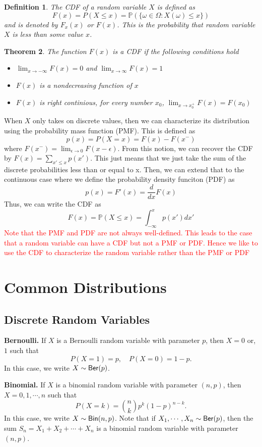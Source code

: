 \documentclass[twoside]{article}
\newcounter{lecnum}
\newcommand{\note}[1]{\textcolor{red}{#1}}
\newtheorem{theorem}{Theorem}[lecnum]
\newtheorem{definition}[theorem]{Definition}
\newcommand{\prob}{\mathbb{P}}
\begin{document}
\begin{definition}
The CDF of a random variable $X$ is defined as
$$F(x) = P(X\leq x) = \mathbb{P}(\{\omega\in\Omega: X(\omega)\leq x\})$$
and is denoted by $F_x(x)$ or $F(x)$. This is the probability that random variable $X$ is less than some value $x$.
\end{definition}
\begin{theorem}
    The function $F(x)$ is a CDF if the following conditions hold
    \begin{itemize}
        \item [(1)]$\lim_{x\rightarrow - \infty}F(x)=0$ and $\lim_{x\rightarrow  \infty}F(x)=1$ 
        \item [(2)] $F(x)$ is a nondecreasing function of $x$
        \item [(3)] $F(x)$ is right continious, for every number $x_0$, $\lim_{x\rightarrow x_0^+}F(x)=F(x_0)$
    \end{itemize}
\end{theorem}
When $X$ only takes on discrete values, then we can characterize its distribution using the probability mass function (PMF). This is defined as 
$$p(x)=P(X=x)=F(x)-F(x^-)$$
where $F(x^-)=\lim_{\epsilon\rightarrow 0}F(x-\epsilon)$. From this notion, we can recover the CDF by $F(x)=\sum_{x'\leq x}p(x')$. This just means that we just take the sum of the discrete probabilities less than or equal to x. Then, we can extend that to the continuous case where we define the probability density funciton (PDF) as 
$$
p(x)=F'(x)=\frac{d}{dx}F(x)
$$
Thus, we can write the CDF as 
$$
F(x)=\prob(X\leq x) = \int_{-\infty}^xp(x')dx'
$$
\note{Note that the PMF and PDF are not always well-defined. This leads to the case that a random variable can have a CDF but not a PMF or PDF. Hence we like to use the CDF to characterize the random variable rather than the PMF or PDF}
\section{Common Distributions}
\subsection{Discrete Random Variables}
{\bf Bernoulli.}
If $X$ is a Bernoulli random variable with parameter $p$, 
then $X=0$ or, $1$ such that
$$
P(X=1) = p,\quad P(X=0)=1-p.
$$
In this case, we write $X\sim {\sf Ber}(p)$.

{\bf Binomial.}
If $X$ is a binomial random variable with parameter $(n,p)$, then
$X=0,1,\cdots, n$ such that
$$
P(X=k) = {n \choose k} p^k (1-p)^{n-k}.
$$
In this case, we write $X\sim {\sf Bin}(n,p)$.
Note that 
if $X_1,\cdots, X_n\sim {\sf Ber}(p)$, then
the sum $S_n = X_1+X_2+\cdots+X_n$ is a binomial random variable with parameter $(n,p)$. 
\end{document}

